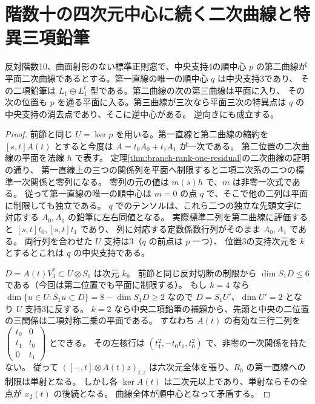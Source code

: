 \section{階数十の四次元中心に続く二次曲線と特異三項鉛筆}
\label{sec:rank-ten-conic-after-center}
\begin{theorem}\label{thm:rank-ten-conic-after-center}
反対階数10、曲面射影のない標準正則窓で、中央支持4の順中心 $p$ の第二曲線が
平面二次曲線であるとする。第一直線の唯一の順中心 $q$ は中央支持3であり、
その二項鉛筆は $L_1\oplus L_1^t$ 型である。第二曲線の次の第三曲線は平面に入り、
その次の位置も $p$ を通る平面に入る。第三曲線が三次なら平面三次の特異点は
$q$ の中央支持の消去点であり、そこに逆中心がある。
逆向きにも成立する。
\end{theorem}
\begin{proof}
前節と同じ $U=\ker p$ を用いる。第一直線と第二曲線の縮約を
$[s,t]A(t)$ とすると今度は $A=t_0A_0+t_1A_1$ が一次である。
第二位置の二次曲線の平面を法線 $h$ で表す。
定理\ref{thm:branch-rank-one-residual}の二次曲線の証明の通り、
第一直線上の三つの関係列を平面へ制限すると二項二次系の二つの標準一次関係と零列になる。
零列の元の値は $m(s)h$ で、$m$ は非零一次式である。
従って第一直線の唯一の順中心は $m=0$ の点 $q$ で、そこで他の二列は平面に制限しても独立である。
$q$ でのテンソルは、これら二つの独立な先頭文字に対応する $A_0,A_1$ の鉛筆に左右同値となる。
実際標準二列を第二曲線に評価すると $[s,t]t_0,[s,t]t_1$ であり、
列に対応する定数係数行列がそのまま $A_0,A_1$ である。
両行列を合わせた $U$ 支持は3（$q$ の前点は $p$ 一つ）、
位置3の支持次元を $k$ とするとこれは $q$ の中央支持である。

$D=A(t)V_3^*\subset U\otimes S_1$ は次元 $k$。
前節と同じ反対切断の制限から $\dim S_1D\le6$ である（今回は第二位置でも平面に制限する）。
もし $k=4$ なら $\dim\{u\in U:S_1u\subset D\}=8-\dim S_1D\ge2$ なので
$D=S_1U'$、$\dim U'=2$ となり $U$ 支持3に反する。
$k=2$ なら中央二項鉛筆の補題から、先頭と中央の二位置の三関係は二項対称二乗の平面である。
すなわち $A(t)$ の有効な三行二列を
$\left(\begin{smallmatrix}t_0&0\\ t_1&t_0\\0&t_1\end{smallmatrix}\right)$ とできる。
その左核行は $(t_1^2,-t_0t_1,t_0^2)$ で、非零の一次関係を持たない。
従って $([-,t]\otimes A(t)z)_{t,z}$ は六次元全体を張り、$R_0$ の第一直線への制限は単射となる。
しかし各 $\ker A(t)$ は二次元以上であり、単射ならその全点が $x_2(t)$ の後続となる。
曲線全体が順中心となって矛盾する。


\end{proof}
